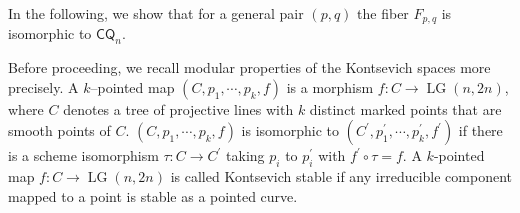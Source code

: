 \documentclass[10pt]{amsart}
\theoremstyle{definition}
\newcommand{\C}{\mathbb{C}}
\newcommand{\Mbar}{\overline{M}}
\newcommand{\LG}{\operatorname{LG}}
\newcommand{\CQ}{\mathsf{CQ}}
\theoremstyle{plain} %
\begin{document}

In the following, we show that for a general pair $(p,q)$ the fiber $F_{p,q}$ is isomorphic to $\CQ_n$.

Before proceeding, we recall modular properties of the Kontsevich spaces more precisely. A $k$--pointed map $(C,p_1,\cdots, p_k,f)$ is a morphism $f\colon C \to \LG(n,2n)$, where $C$ denotes a tree of projective lines with $k$ distinct marked points that are smooth points of $C$. $(C,p_1,\cdots, p_k,f)$ is isomorphic to $(C^{\prime},p_1^{\prime},\cdots, p_k^{\prime},f^{\prime})$ if there is a scheme isomorphism $\tau\colon C\rightarrow C^{\prime}$ taking $p_i$ to $p^{\prime}_i$ with $f^{\prime}\circ\tau =f$. 
A $k$-pointed map $f\colon C\rightarrow \LG(n,2n)$ is called Kontsevich stable if any irreducible component mapped to a point is stable as a pointed curve. 


\end{document}
